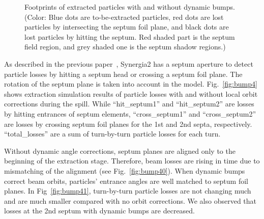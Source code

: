 \documentclass[aps,prstab,onecolumn,preprint,endfloats,11pt]{revtex4-1}
\begin{document}
\begin{figure}[!tbp]
  \caption{\label{fig:bump3}Footprints of extracted particles with and without dynamic bumps. (Color: Blue dots are to-be-extracted particles, red dots are lost particles by intersecting the septum foil plane, and black dots are lost particles by hitting the septum. Red shaded part is the septum field region, and grey shaded one is the septum shadow regions.)}
\end{figure}

As described in the previous paper~\cite{mu2e}, Synergia2 has a septum aperture to detect particle losses by hitting a septum head or crossing a septum foil plane.
The rotation of the septum plane is taken into account in the model.
Fig.~\ref{fig:bump4} shows extraction simulation results of particle losses with and without local orbit corrections during the spill.
While ``hit\_septum1'' and ``hit\_septum2'' are losses by hitting entrances of septum elements, ``cross\_septum1'' and ``cross\_septum2'' are losses by crossing septum foil planes for the 1st and 2nd septa, respectively.
``total\_losses'' are a sum of turn-by-turn particle losses for each turn.

Without dynamic angle corrections, septum planes are aligned only to the beginning of the extraction stage.
Therefore, beam losses are rising in time due to mismatching of the alignment (see Fig.~\ref{fig:bump40}).
When dynamic bumps correct beam orbits, particles' entrance angles are well matched to septum foil planes.
In Fig~\ref{fig:bump41}, turn-by-turn particle losses are not changing much and are much smaller compared with no orbit corrections.
We also observed that losses at the 2nd septum with dynamic bumps are decreased.
\end{document}
